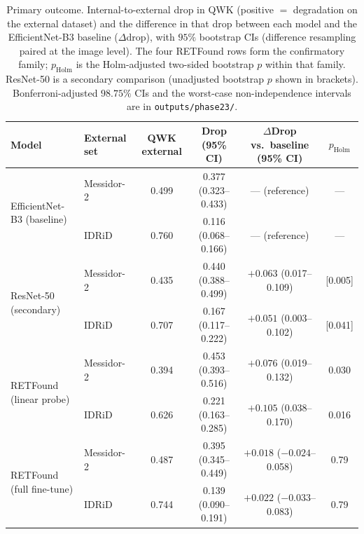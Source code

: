 \documentclass[journal]{IEEEtran}
\renewcommand{\_}{\origunderscore\allowbreak}
\begin{document}
\begin{table}[!t]
\centering\footnotesize
\caption{Primary outcome. Internal-to-external drop in QWK (positive $=$
degradation on the external dataset) and the difference in that drop between
each model and the EfficientNet-B3 baseline ($\Delta$drop), with $95\%$
bootstrap CIs (difference resampling paired at the image level). The four
RETFound rows form the confirmatory family; $p_{\mathrm{Holm}}$ is the
Holm-adjusted two-sided bootstrap $p$ within that family. ResNet-50 is a
secondary comparison (unadjusted bootstrap $p$ shown in brackets).
Bonferroni-adjusted $98.75\%$ CIs and the worst-case non-independence intervals
are in \texttt{outputs/\allowbreak{}phase23/}.}
\label{tab:drop}
\setlength{\tabcolsep}{5pt}
\begin{tabular}{llcccc}
\toprule
Model & External set & QWK external & Drop (95\% CI) & $\Delta$Drop vs.\ baseline (95\% CI) & $p_{\mathrm{Holm}}$ \\
\midrule
\multirow{2}{*}{EfficientNet-B3 (baseline)}
 & Messidor-2 & 0.499 & 0.377 (0.323--0.433) & --- (reference) & --- \\
 & IDRiD      & 0.760 & 0.116 (0.068--0.166) & --- (reference) & --- \\
\midrule
\multirow{2}{*}{ResNet-50 (secondary)}
 & Messidor-2 & 0.435 & 0.440 (0.388--0.499) & $+0.063$ (0.017--0.109) & [0.005] \\
 & IDRiD      & 0.707 & 0.167 (0.117--0.222) & $+0.051$ (0.003--0.102) & [0.041] \\
\midrule
\multirow{2}{*}{RETFound (linear probe)}
 & Messidor-2 & 0.394 & 0.453 (0.393--0.516) & $+0.076$ (0.019--0.132) & 0.030 \\
 & IDRiD      & 0.626 & 0.221 (0.163--0.285) & $+0.105$ (0.038--0.170) & 0.016 \\
\midrule
\multirow{2}{*}{RETFound (full fine-tune)}
 & Messidor-2 & 0.487 & 0.395 (0.345--0.449) & $+0.018$ ($-0.024$--0.058) & 0.79 \\
 & IDRiD      & 0.744 & 0.139 (0.090--0.191) & $+0.022$ ($-0.033$--0.083) & 0.79 \\
\bottomrule
\end{tabular}
\end{table}
\end{document}
